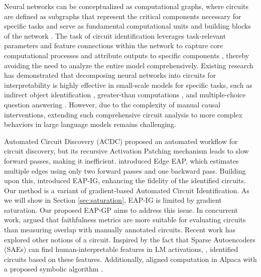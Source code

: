 Neural networks can be conceptualized as computational graphs, where circuits are defined as subgraphs that represent the critical components necessary for specific tasks and serve as fundamental computational units and building blocks of the network \citep{bereska2024mechanistic}. The task of circuit identification leverages task-relevant parameters \citep{bereska2024mechanistic} and feature connections \citep{he2024dictionary} within the network to capture core computational processes and attribute outputs to specific components \citep{miller2024transformer}, thereby avoiding the need to analyze the entire model comprehensively. Existing research has demonstrated that decomposing neural networks into circuits for interpretability is highly effective in small-scale models for specific tasks, such as indirect object identification \citep{wang2023interpretability}, greater-than computations \citep{hanna2024faith}, and multiple-choice question answering \citep{lieberum2023circuit}. However, due to the complexity of manual causal interventions, extending such comprehensive circuit analysis to more complex behaviors in large language models remains challenging.

Automated Circuit Discovery (ACDC) \citep{conmy2023automated} proposed an automated workflow for circuit discovery, but its recursive Activation Patching mechanism leads to slow forward passes, making it inefficient. \citet{syed2023attribution} introduced Edge EAP, which estimates multiple edges using only two forward passes and one backward pass. Building upon this, \citet{hanna2024faith} introduced EAP-IG, enhancing the fidelity of the identified circuits.  Our method is a variant of gradient-based Automated Circuit Identification. 
As we will show in Section \ref{sec:saturation}, EAP-IG is limited by gradient saturation. Our proposed EAP-GP aims to address this issue.
In concurrent work, \citet{hanna2024gpt2} argued that faithfulness metrics are more suitable for evaluating circuits than measuring overlap with manually annotated circuits. Recent work has explored other notions of a circuit. Inspired by the fact that Sparse Autoencoders (SAEs) can find human-interpretable features in LM activations, \citep{cunningham2023sparse}, \citet{marks2024sparse} identified circuits based on these features. Additionally, \citet{wu2024interpretability} aligned computation in Alpaca \citep{taori2023stanford} with a proposed symbolic algorithm \citep{geiger2024finding}.